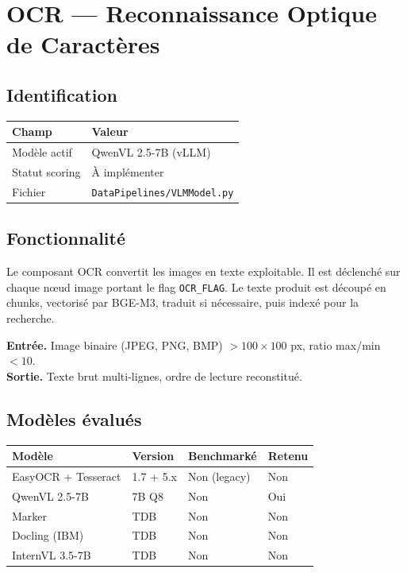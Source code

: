 \chapter{OCR --- Reconnaissance Optique de Caractères}

\section{Identification}

\begin{center}
\begin{tabular}{ll}
\toprule
\textbf{Champ} & \textbf{Valeur} \\
\midrule
Modèle actif    & QwenVL 2.5-7B (vLLM) \\
Statut scoring  & À implémenter \\
Fichier         & \texttt{DataPipelines/VLMModel.py} \\
\bottomrule
\end{tabular}
\end{center}

\section{Fonctionnalité}

Le composant OCR convertit les images en texte exploitable. Il est déclenché
sur chaque n\oe ud image portant le flag \texttt{OCR\_FLAG}. Le texte produit
est découpé en chunks, vectorisé par BGE-M3, traduit si nécessaire, puis
indexé pour la recherche.

\textbf{Entrée.} Image binaire (JPEG, PNG, BMP) $> 100 \times 100$ px, ratio
max/min $< 10$.\\
\textbf{Sortie.} Texte brut multi-lignes, ordre de lecture reconstitué.

\section{Modèles évalués}

\begin{center}
\begin{tabular}{llll}
\toprule
\textbf{Modèle} & \textbf{Version} & \textbf{Benchmarké} & \textbf{Retenu} \\
\midrule
EasyOCR + Tesseract & 1.7 + 5.x & Non (legacy)   & Non \\
QwenVL 2.5-7B       & 7B Q8     & Non            & Oui \\
Marker              & TDB       & Non        & Non \\
Docling (IBM)       & TDB       & Non        & Non \\
InternVL 3.5-7B     & TDB       & Non        & Non \\
\bottomrule
\end{tabular}
\end{center}

